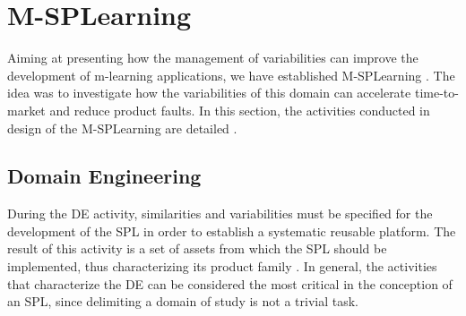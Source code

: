 \section{M-SPLearning}\label{section3}

Aiming at presenting how the management of variabilities can improve the development of m-learning applications, we have established M-SPLearning \cite{falvojr14a, falvojr14b}. The idea was to investigate how the variabilities of this domain can accelerate time-to-market and reduce product faults. In this section, the activities conducted in design of the M-SPLearning are detailed \cite{oliveirajr10, filho13, krueger02, kang90}.


\subsection{Domain Engineering}\label{section31}

During the DE activity, similarities and variabilities must be specified for the development of the SPL in order to establish a systematic reusable platform. The result of this activity is a set of assets from which the SPL should be implemented, thus characterizing its product family \cite{bockle05, vanderlinden07}. In general, the activities that characterize the DE can be considered the most critical in the conception of an SPL, since delimiting a domain of study is not a trivial task.

